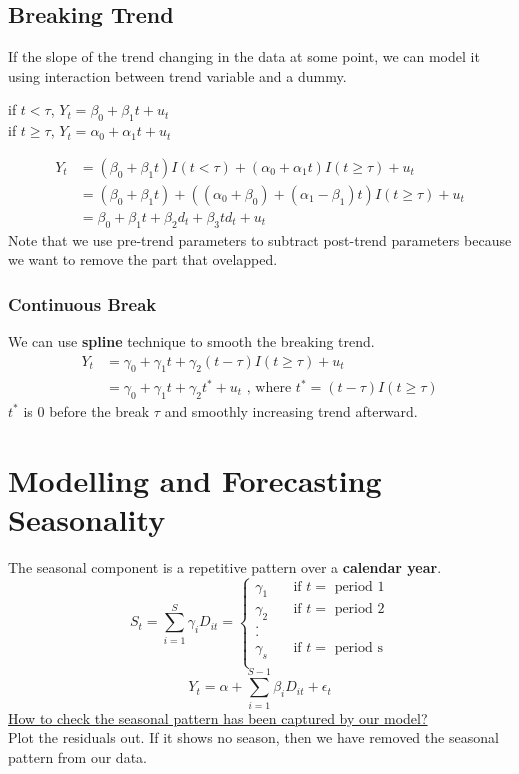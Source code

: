 \documentclass{article}
\begin{document}
\subsection{Breaking Trend}
If the slope of the trend changing in the data at some point, we can model it using interaction between trend variable and a dummy.
\begin{center} 
if $t < \tau$, $Y_t = \beta_0 + \beta_1 t + u_t$\\
if $t \geq \tau$, $Y_t = \alpha_0 + \alpha_1 t + u_t$
\end{center}

\begin{align*}
    Y_t &= (\beta_0 + \beta_1 t)I(t < \tau) + (\alpha_0 + \alpha_1 t) I(t \geq \tau) + u_t \\
    &= (\beta_0 + \beta_1 t) + ((\alpha_0 + \beta_0) + (\alpha_1 - \beta_1)t) I(t \geq \tau) + u_t\\
    &= \beta_0 + \beta_1 t + \beta_2d_t + \beta_3td_t + u_t
\end{align*}
Note that we use pre-trend parameters to subtract post-trend parameters because we want to remove the part that ovelapped. 

\subsubsection{Continuous Break}
We can use \textbf{spline} technique to smooth the breaking trend.
\begin{align*}
    Y_t &= \gamma_0 + \gamma_1t + \gamma_2(t-\tau)I(t \geq \tau) + u_t \\
    &= \gamma_0 + \gamma_1t + \gamma_2t^* + u_t \text{ , where  } t^* = (t-\tau)I(t\geq \tau)
\end{align*}
$t^*$ is 0 before the break $\tau$ and smoothly increasing trend afterward.

\section{Modelling and Forecasting Seasonality}
The seasonal component is a repetitive pattern over a \textbf{calendar year}.
\begin{equation*}
S_t = \sum_{i=1}^S \gamma_i D_{it} = \left\{
        \begin{array}{ll}
            \gamma_1 & \quad \text{if } t = \text{ period 1} \\
            \gamma_2 & \quad \text{if } t = \text{ period 2} \\
            .\\
            .\\
            \gamma_s & \quad \text{if } t = \text{ period s} \\
        \end{array}
    \right.
\end{equation*}
$$Y_t = \alpha + \sum_{i=1}^{S-1} \beta_i D_{it} + \epsilon_t$$
\underline{How to check the seasonal pattern has been captured by our model?} \\
Plot the residuals out. If it shows no season, then we have removed the seasonal pattern from our data.
\end{document}
